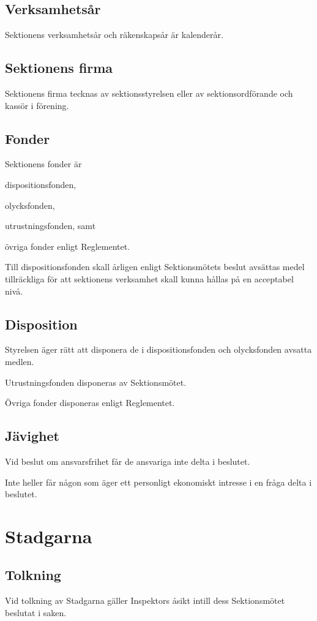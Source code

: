\documentclass[10pt]{article}
\begin{document}
\subsection{Verksamhetsår}
Sektionens verksamhetsår och räkenskapsår är kalenderår.

\subsection{Sektionens firma}
Sektionens firma tecknas av sektionsstyrelsen eller av sektionsordförande och kassör i förening.

\subsection{Fonder}
Sektionens fonder är
\begin{alphlist}
\item dispositionsfonden,
\item olycksfonden,
\item utrustningsfonden, samt
\item övriga fonder enligt Reglementet.
\end{alphlist}

Till dispositionsfonden skall årligen enligt Sektionsmötets beslut avsättas
medel tillräckliga för att sektionens verksamhet skall kunna hållas på en
acceptabel nivå.

\subsection{Disposition}
Styrelsen äger rätt att disponera de i dispositionsfonden och olycksfonden
avsatta medlen.

Utrustningsfonden disponeras av Sektionsmötet.

Övriga fonder disponeras enligt Reglementet.

\subsection{Jävighet}
Vid beslut om ansvarsfrihet får de ansvariga inte delta i beslutet.

Inte heller får någon som äger ett personligt ekonomiskt intresse i en
fråga delta i beslutet.
\newpage

\section{Stadgarna}
\subsection{Tolkning}
Vid tolkning av Stadgarna gäller Inspektors åsikt intill dess Sektionsmötet
beslutat i saken.
\end{document}
